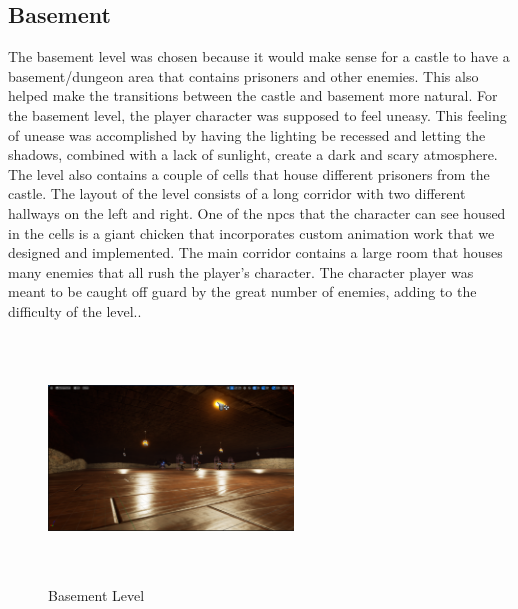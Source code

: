 \documentclass{sigchi}
\begin{document}
\subsection{Basement}
The basement level was chosen because it would make sense for a castle to have a basement/dungeon area that contains prisoners and other enemies. This also helped make the transitions between the castle and basement more natural. For the basement level, the player character was supposed to feel uneasy. This feeling of unease was accomplished by having the lighting be recessed and letting the shadows, combined with a lack of sunlight, create a dark and scary atmosphere. The level also contains a couple of cells that house different prisoners from the castle. The layout of the level consists of a long corridor with two different hallways on the left and right. One of the npcs that the character can see housed in the cells is a giant chicken that incorporates custom animation work that we designed and implemented. The main corridor contains a large room that houses many enemies that all rush the player's character. The character player was meant to be caught off guard by the great number of enemies, adding to the difficulty of the level..
\begin{figure}


\includegraphics[width=6.5cm, height=6.5cm]{Figure/basement.png}
\caption{Basement Level}
\end{figure}
\end{document}
